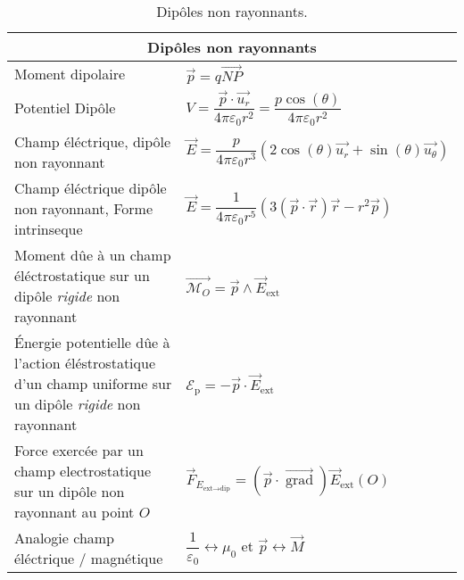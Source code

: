 \documentclass[10pt,a4paper,titlepage,landscape]{article}
\newcommand{\grad}
{
    \vec{\operatorname{grad}}
}
\renewcommand{\arraystretch}{2}
\begin{document}
\begin{table}[H]
    \centering
    \renewcommand{\arraystretch}{1.5} %
    \setlength{\tabcolsep}{8pt} %
    \begin{tabular}{@{}|p{9cm}|p{10cm}@{}|}

        \multicolumn{2}{c}{\textbf{Dipôles non rayonnants}} \\ \hline

        Moment dipolaire & $\vec p = q \vec{NP}$ \\ \hline
        Potentiel Dipôle & $V = \dfrac{\vec{p} \cdot \vec{u_r}}{4\pi \varepsilon_0 r^2} = \dfrac{p\cos(\theta)}{4\pi \varepsilon_0 r^2}$ \\ \hline 
        Champ éléctrique, dipôle non rayonnant & $\vec{E} = \dfrac{p}{4\pi \varepsilon_0 r^3}(2\cos(\theta) \vec{u_r} + \sin(\theta) \vec{u_\theta})$ \\ \hline 
        Champ éléctrique dipôle non rayonnant, Forme intrinseque & $\vec{E} = \dfrac{1}{4\pi\varepsilon_0 r^5}(3(\vec{p} \cdot \vec{r})\vec{r} - r^2\vec{p})$ \\ \hline 
        Moment dûe à un champ éléctrostatique sur un dipôle \textit{rigide} non rayonnant & $\vec{\mathcal{M}_O}=\vec{p}\wedge \vec{E}_{\text{ext}}$ \\ \hline
        Énergie potentielle dûe à l'action éléstrostatique d'un champ uniforme sur un dipôle \textit{rigide} non rayonnant & $\mathcal{E}_{\text{p}} = -\vec{p}\cdot\vec{E}_{\text{ext}}$\\ \hline
        Force exercée par un champ electrostatique sur un dipôle non rayonnant au point $O$ & $\vec{F}_{E_{\text{ext}\longrightarrow\text{dip}}} = \left(\vec{p}\cdot\grad\right)\vec{E}_{\text{ext}}(O)$\\ \hline
        Analogie champ éléctrique $/$ magnétique & $\dfrac{1}{\varepsilon_0} \longleftrightarrow \mu_0$ et $\vec{p} \longleftrightarrow \vec{M}$ \\ \hline
                
    \end{tabular}
\caption{Dipôles non rayonnants.}
\label{tab:denr}
\end{table}
\end{document}
